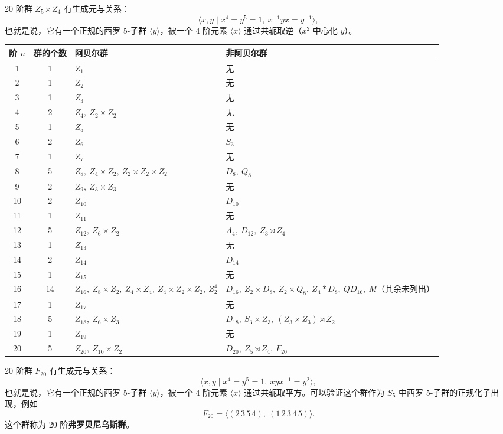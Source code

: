 20 阶群 \(Z_5 \rtimes Z_4\) 有生成元与关系：
\[
\langle x, y \mid x^4 = y^5 = 1,\ x^{-1}yx = y^{-1} \rangle,
\]
也就是说，它有一个正规的西罗 5-子群 \(\langle y \rangle\)，被一个 4 阶元素 \(\langle x \rangle\) 通过共轭取逆（\(x^2\) 中心化 \(y\)）。

\begin{center}
\begin{tabular}{|c|c|l|l|}
\hline
阶 \(n\) & 群的个数 & 阿贝尔群 & 非阿贝尔群 \\
\hline
1 & 1 & \(Z_1\) & 无 \\
2 & 1 & \(Z_2\) & 无 \\
3 & 1 & \(Z_3\) & 无 \\
4 & 2 & \(Z_4,\ Z_2 \times Z_2\) & 无 \\
5 & 1 & \(Z_5\) & 无 \\
6 & 2 & \(Z_6\) & \(S_3\) \\
7 & 1 & \(Z_7\) & 无 \\
8 & 5 & \(Z_8,\ Z_4 \times Z_2,\ Z_2 \times Z_2 \times Z_2\) & \(D_8,\ Q_8\) \\
9 & 2 & \(Z_9,\ Z_3 \times Z_3\) & 无 \\
10 & 2 & \(Z_{10}\) & \(D_{10}\) \\
11 & 1 & \(Z_{11}\) & 无 \\
12 & 5 & \(Z_{12},\ Z_6 \times Z_2\) & \(A_4,\ D_{12},\ Z_3 \rtimes Z_4\) \\
13 & 1 & \(Z_{13}\) & 无 \\
14 & 2 & \(Z_{14}\) & \(D_{14}\) \\
15 & 1 & \(Z_{15}\) & 无 \\
16 & 14 & \(Z_{16},\ Z_8 \times Z_2,\ Z_4 \times Z_4,\ Z_4 \times Z_2 \times Z_2,\ Z_2^4\) & \(D_{16},\ Z_2 \times D_8,\ Z_2 \times Q_8,\ Z_4 * D_8,\ QD_{16},\ M\)（其余未列出） \\
17 & 1 & \(Z_{17}\) & 无 \\
18 & 5 & \(Z_{18},\ Z_6 \times Z_3\) & \(D_{18},\ S_3 \times Z_3,\ (Z_3 \times Z_3) \rtimes Z_2\) \\
19 & 1 & \(Z_{19}\) & 无 \\
20 & 5 & \(Z_{20},\ Z_{10} \times Z_2\) & \(D_{20},\ Z_5 \rtimes Z_4,\ F_{20}\) \\
\hline
\end{tabular}
\end{center}

20 阶群 \(F_{20}\) 有生成元与关系：
\[
\langle x, y \mid x^4 = y^5 = 1,\ xyx^{-1} = y^2 \rangle,
\]
也就是说，它有一个正规的西罗 5-子群 \(\langle y \rangle\)，被一个 4 阶元素 \(\langle x \rangle\) 通过共轭取平方。可以验证这个群作为 \(S_5\) 中西罗 5-子群的正规化子出现，例如
\[
F_{20} = \langle (2\,3\,5\,4),\ (1\,2\,3\,4\,5) \rangle.
\]
这个群称为 20 阶\textbf{弗罗贝尼乌斯群}。

